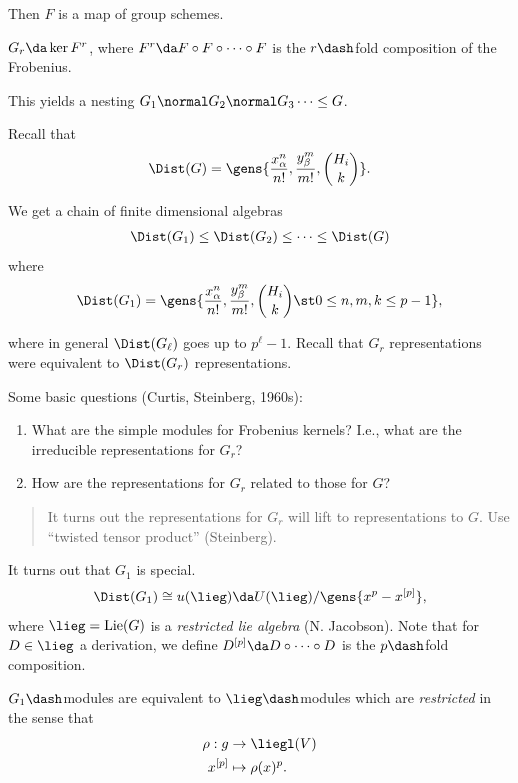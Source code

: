 Then \(F\) is a map of group schemes.

\begin{definition}

\(G_r \da \ker F^r\), where \(F^r \da F\circ F \circ \cdots \circ F\) is
the \(r\dash\)fold composition of the Frobenius.

This yields a nesting \(G_1 \normal G_2 \normal G_3 \cdots \leq G\).

\end{definition}

Recall that
\begin{align*}  
\Dist(G) = \gens{ {x_\alpha^n \over n!}, {y_\beta^m \over m!}, {H_i \choose k} }
.\end{align*}

We get a chain of finite dimensional algebras
\begin{align*}  
\Dist(G_1) \leq \Dist(G_2) \leq \cdots \leq \Dist(G)
\end{align*} where
\begin{align*}  
\Dist(G_1) = \gens{ {x_\alpha^n \over n!}, {y_\beta^m \over m!}, {H_i \choose k} \st 0\leq n,m,k \leq p-1 }
,\end{align*}

where in general \(\Dist(G_\ell)\) goes up to \(p^{\ell} - 1\). Recall
that \(G_r\) representations were equivalent to \(\Dist(G_r)\)
representations.

Some basic questions (Curtis, Steinberg, 1960s):

\begin{enumerate}
\def\labelenumi{\arabic{enumi}.}
\item
  What are the simple modules for Frobenius kernels? I.e., what are the
  irreducible representations for \(G_r\)?
\item
  How are the representations for \(G_r\) related to those for \(G\)?
\end{enumerate}

\begin{quote}
It turns out the representations for \(G_r\) will lift to
representations to \(G\). Use ``twisted tensor product'' (Steinberg).
\end{quote}

\begin{remark}

It turns out that \(G_1\) is special.
\begin{align*}  
\Dist(G_1) \cong u(\lieg) \da U(\lieg) / \gens{x^p - x^{[p]}}
,\end{align*} where \(\lieg = \mathrm{Lie}(G)\) is a \emph{restricted
lie algebra} (N. Jacobson). Note that for \(D\in \lieg\) a derivation,
we define \(D^{[p]} \da D\circ \cdots \circ D\) is the \(p\dash\)fold
composition.

\(G_1\dash\)modules are equivalent to \(\lieg\dash\)modules which are
\emph{restricted} in the sense that
\begin{align*}  
\rho: g &\to \liegl(V) \\
x^{[p]} &\mapsto \rho(x)^p
.\end{align*}

\end{remark}

